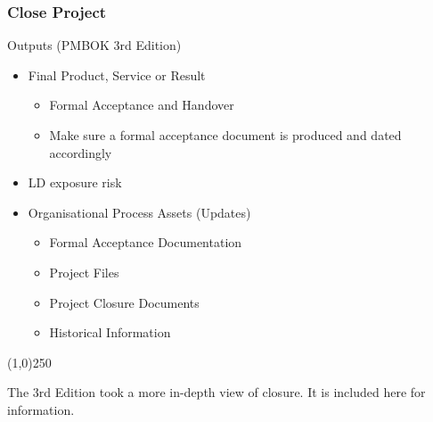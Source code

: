 \begin{frame}
\frametitle{Close Project}
Outputs (PMBOK 3rd Edition)
\begin{itemize}
	\item Final Product, Service or Result
		\begin{itemize}
			\item Formal Acceptance and Handover
			\item Make sure a formal acceptance document is produced and dated accordingly
		\end{itemize}
	\item LD exposure risk
	\item Organisational Process Assets (Updates)
		\begin{itemize}
			\item Formal Acceptance Documentation
			\item Project Files
			\item Project Closure Documents
			\item Historical Information
		\end{itemize}
\end{itemize}
\end{frame}\begin{center}\line(1,0){250}\end{center}


The 3rd Edition took a more in-depth view of closure.  It is included here for information. 

%
%







